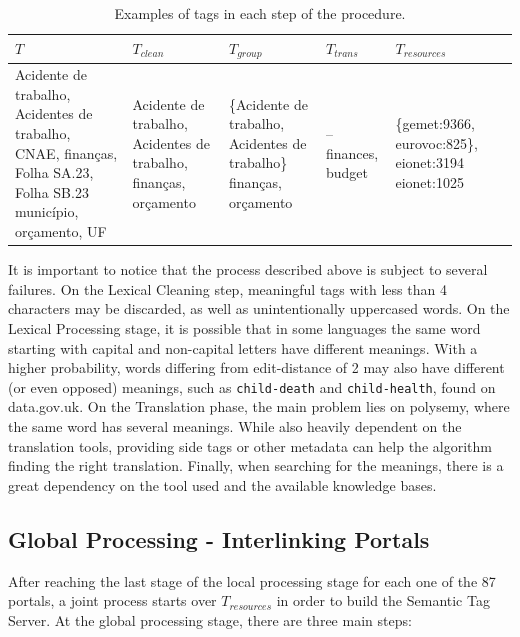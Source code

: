 \begin{table}[]
\centering
\ABNTEXfontereduzida
\caption{Examples of tags in each step of the procedure.}
\label{tab:local_example}
\begin{tabular}{|p{2cm}|p{2cm}|p{2cm}|p{2cm}|p{2cm}|p{2cm}|}
\hline
$T$ & $T_{clean}$ & $T_{group}$ & $T_{trans}$ & $T_{resources}$ \\ \hline
Acidente de trabalho,
Acidentes de trabalho,
CNAE,
finanças,
Folha SA.23,
Folha SB.23 
município,
orçamento,
UF
&
Acidente de trabalho,
Acidentes de trabalho,
finanças,
orçamento
&
\{Acidente de trabalho, Acidentes de trabalho\}
finanças,
orçamento
&
--
finances,
budget
&
\{gemet:9366, eurovoc:825\},
eionet:3194
eionet:1025 \\ \hline
\end{tabular}
\end{table}

It is important to notice that the process described above is subject to several failures.
On the Lexical Cleaning step, meaningful tags with less than 4 characters may be discarded, as well as unintentionally uppercased words.
On the Lexical Processing stage, it is possible that in some languages the same word starting with capital and non-capital letters have different meanings.
With a higher probability, words differing from edit-distance of 2 may also have different (or even opposed) meanings, such as \texttt{child-death} and \texttt{child-health}, found on data.gov.uk.
On the Translation phase, the main problem lies on polysemy, where the same word has several meanings.
While also heavily dependent on the translation tools, providing side tags or other metadata can help the algorithm finding the right translation.
Finally, when searching for the meanings, there is a great dependency on the tool used and the available knowledge bases.

\subsection{Global Processing - Interlinking Portals}
\label{sec:global_building}

After reaching the last stage of the local processing stage for each one of the 87 portals, a joint process starts over $T_{resources}$ in order to build the Semantic Tag Server.
At the global processing stage, there are three main steps:

